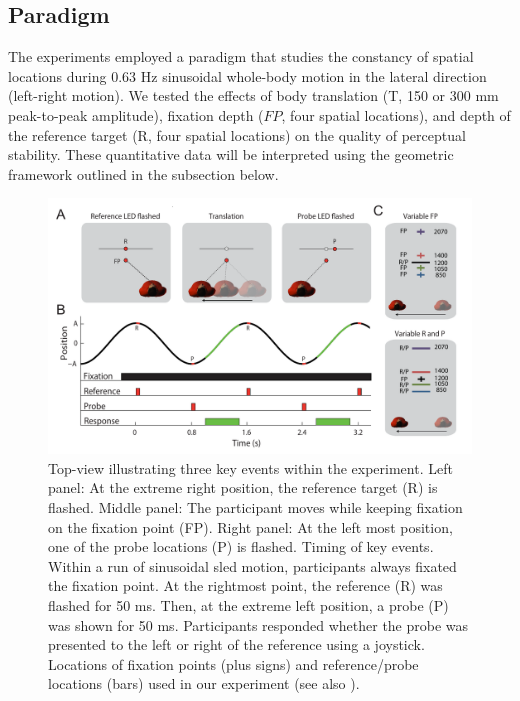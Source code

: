 \subsection{Paradigm}

The experiments employed a paradigm that studies the constancy of spatial locations during 0.63 \si{\hertz} sinusoidal whole-body motion in the lateral direction (left-right motion). We tested the effects of body translation (T, 150 or 300 \si{\milli\metre} peak-to-peak amplitude), fixation depth ($FP$, four spatial locations), and depth of the reference target (R, four spatial locations) on the quality of perceptual stability. These quantitative data will be interpreted using the geometric framework outlined in the subsection  below.

\begin{figure}
	\includegraphics[width=1.0\textwidth]{src/paper2/figure1.pdf}

	\caption{ Top-view illustrating three key events within the experiment. Left panel: At the extreme right position, the reference target (R) is flashed. Middle panel: The participant moves while keeping fixation on the fixation point (FP). Right panel: At the left most position, one of the probe locations (P) is flashed.  Timing of key events. Within a run of sinusoidal sled motion, participants always fixated the fixation point. At the rightmost point, the reference (R) was flashed for 50 \si{\milli\second}. Then, at the extreme left position, a probe (P) was shown for 50 \si{\milli\second}. Participants responded whether the probe was presented to the left or right of the reference using a joystick.  Locations of fixation points (plus signs) and reference/probe locations (bars) used in our experiment (see also ).}

	\label{p2:fig1}
\end{figure}

